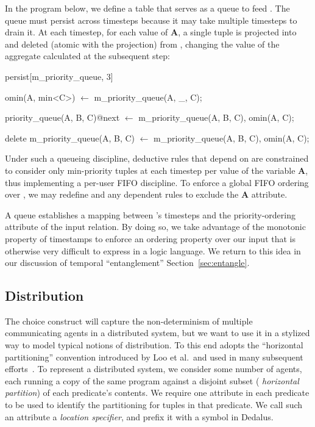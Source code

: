 In the program below, we define a table  that
serves as a queue to feed .  The queue must persist
across timesteps because it may take multiple timesteps to drain it.  At each
timestep, for each value of \textbf{A}, a single tuple is projected into
 and deleted (atomic with the projection) from
, changing the value of the aggregate calculated
at the subsequent step:

\begin{Dedalus}
persist[m\_priority\_queue, 3]

omin(A, min<C>) \(\leftarrow\)
  m\_priority\_queue(A, _, C);

priority_queue(A, B, C)@next \(\leftarrow\)
  m\_priority\_queue(A, B, C),
  omin(A, C);

delete m\_priority\_queue(A, B, C) \(\leftarrow\)
  m\_priority\_queue(A, B, C),
  omin(A, C);
\end{Dedalus}

Under such a queueing discipline, deductive rules that depend on
 are constrained to consider only min-priority tuples at each timestep
per value of the variable \textbf{A}, thus implementing a per-user FIFO
discipline.  To enforce a global FIFO ordering over , we
may redefine  and any dependent rules to exclude the \textbf{A}
attribute.

A queue establishes a mapping between \slang's timesteps
and the priority-ordering attribute of the input relation. By doing so, we take advantage of the monotonic property of timestamps to enforce an ordering property over our input that is otherwise 
very difficult to express in a logic language.  We return to this idea in our discussion of temporal ``entanglement'' Section~\ref{sec:entangle}.


\subsection{Distribution}

The choice construct will capture the non-determinism of multiple communicating agents in a distributed system, but we want to use it in a stylized way to model typical notions of distribution.  To this end \lang adopts the ``horizontal partitioning'' convention introduced by Loo et al.\ and used in many subsequent efforts~\cite{Loo:2005}.
To represent a distributed system, we consider some number of agents,
each running a copy of the same program against a disjoint subset ({\em
  horizontal partition}) of each predicate's contents.  We require one
attribute in each predicate to be used to identify the
partitioning for tuples in that predicate. We call such an
attribute a {\em location specifier}, and prefix it with a
\dedalus{\#} symbol in Dedalus.

